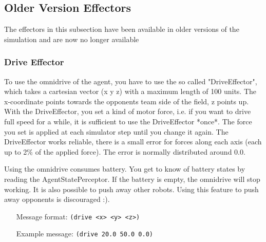 \subsection{Older Version Effectors}
\label{sec:olderversioneffectors}
The effectors in this subsection have been available in older versions of the
simulation and are now no longer available



\subsubsection{Drive Effector}
\label{sec:driveeffector}
To use the omnidrive of the agent, you have to use the so called
"DriveEffector", which takes a cartesian vector (x y z) with a maximum
length of 100 units. The x-coordinate points towards the opponents
team side of the field, z points up. With the DriveEffector, you set a
kind of motor force, i.e. if you want to drive full speed for a while,
it is sufficient to use the DriveEffector *once*. The force you set is
applied at each simulator step until you change it again. The
DriveEffector works reliable, there is a small error for forces along
each axis (each up to 2\% of the applied force). The error is normally
distributed around $0.0$.

Using the omnidrive consumes battery. You get to know of battery
states by reading the AgentStatePerceptor. If the battery is empty,
the omnidrive will stop working. It is also possible to push away
other robots. Using this feature to push away opponents is discouraged
:).

\begin{itemize}
	\item[Message format:] \texttt{(drive <x> <y> <z>)}
	\item[Example message:] \texttt{(drive 20.0 50.0 0.0)}
\end{itemize}



